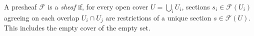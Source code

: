 
A presheaf $\mathcal F$ is a \emph{sheaf} if, for every open cover $U=\bigcup_i U_i$, sections $s_i\in\mathcal F(U_i)$ agreeing on each overlap $U_i\cap U_j$ are restrictions of a unique section $s\in\mathcal F(U)$. This includes the empty cover of the empty set.
